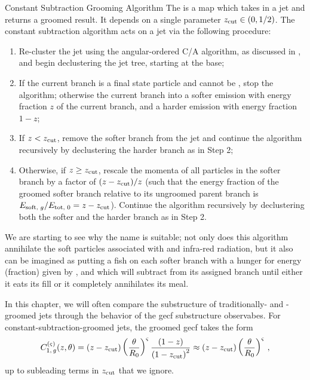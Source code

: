 \begin{definitionbox}{Constant Subtraction Grooming Algorithm}{}
    The  is a map which takes in a jet and returns a groomed result.
    It depends on a single parameter \(z_{\rm cut} \in (0, 1/2)\).
    The constant subtraction algorithm acts on a jet via the following procedure:
    \begin{enumerate}
        \item
            Re-cluster the jet using the angular-ordered C/A algorithm, as discussed in , and begin \gls{declustering} the jet tree, starting at the base;

        \item
            If the current branch is a final state particle and cannot be , stop the algorithm;
            otherwise  the current branch into a softer emission with energy fraction \(z\) of the current branch, and a harder emission with energy fraction \(1-z\);

        \item
            If \(z < z_{\rm cut}\), remove the softer branch from the jet and continue the algorithm recursively by \gls{declustering} the harder branch as in Step 2;

        \item
            Otherwise, if \(z \geq z_{\rm cut}\), rescale the momenta of all particles in the softer branch by a factor of \((z-z_{\rm cut})/z\) (such that the energy fraction of the groomed softer branch relative to its ungroomed parent branch is \(E_{\text{soft, }g}/E_{\text{tot, }0} = z - z_{\rm cut}\)).
            Continue the algorithm recursively by \gls{declustering} both the softer and the harder branch as in Step 2.
    \end{enumerate}
\end{definitionbox}

We are starting to see why the name \PIRANHA{} is suitable;
%
not only does this algorithm annihilate the soft particles associated with  and infra-red radiation, but it also can be imagined as putting a fish on each softer branch with a hunger for energy (fraction) given by \zcut, and which will subtract from its assigned branch until either it eats its fill or it completely annihilates its meal.


\begin{example}
    In this chapter, we will often compare the substructure of traditionally- and \PIRANHA{}-groomed jets through the behavior of the \gls{gecf} substructure observabes.
    For constant-subtraction-groomed jets, the groomed \gls{gecf} takes the form
\begin{equation}
    \label{eq:subtracted-ecf-defn}
    C_{1,\,g}^{(\varsigma)}(z,\theta)
    =
    \left(z - \zcut\right) \left(\frac{\theta}{R_0}\right)^\varsigma \frac{\left(1 - z\right)}{\left(1 - \zcut\right)^2}
    \approx
    \left(z - \zcut\right)\left(\frac{\theta}{R_0}\right)^\varsigma
    \,,
\end{equation}
up to subleading terms in \(z_{\rm cut}\) that we ignore.
\end{example}


